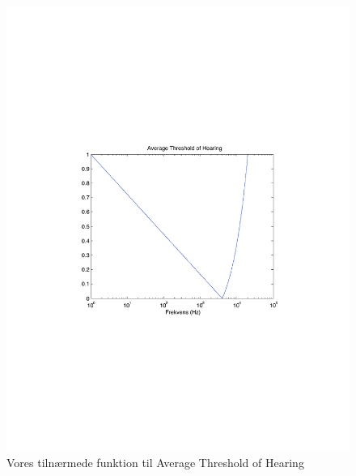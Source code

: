 \begin{figure}[h!]
\begin{center}
\includegraphics[width=12cm]{vores-ath}
\end{center}
\caption{Vores tilnærmede funktion til Average Threshold of Hearing}
\label{fig.vores-ath}
\end{figure}

